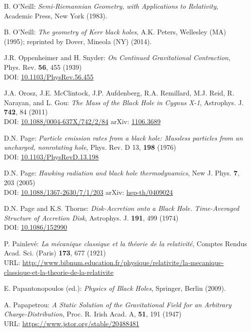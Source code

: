 \begin{thebibliography}{123}
B. O'Neill: {\em Semi-Riemannian Geometry, with Applications to Relativity},
Academic Press, New York (1983).

B. O'Neill: {\em The geometry of Kerr black holes}, A.K. Peters, Wellesley (MA) (1995);
reprinted by Dover, Mineola (NY) (2014).

J.R. Oppenheimer and H. Snyder:
{\em On Continued Gravitational Contraction},
Phys. Rev. {\bf 56}, 455 (1939)\\
DOI: \href{https://doi.org/10.1103/PhysRev.56.455}{10.1103/PhysRev.56.455}

J.A. Orosz, J.E. McClintock, J.P. Aufdenberg, R.A. Remillard, M.J. Reid, R. Narayan, and L. Gou:
{\em The Mass of the Black Hole in Cygnus X-1},
Astrophys. J. {\bf 742}, 84 (2011)\\
DOI: \href{https://doi.org/10.1088/0004-637X/742/2/84}{10.1088/0004-637X/742/2/84}\hfill
arXiv: \href{https://arxiv.org/abs/1106.3689}{1106.3689}

D.N. Page:
{\em Particle emission rates from a black hole: Massless particles from an uncharged, nonrotating hole},
Phys. Rev. D 13, {\bf 198} (1976)\\
DOI: \href{https://doi.org/10.1103/PhysRevD.13.198}{10.1103/PhysRevD.13.198}

D.N. Page:
{\em Hawking radiation and black hole thermodynamics},
New J. Phys. {\bf 7}, 203 (2005)\\
DOI: \href{https://doi.org/10.1088/1367-2630/7/1/203}{10.1088/1367-2630/7/1/203}\hfill
arXiv: \href{https://arxiv.org/abs/hep-th/0409024}{hep-th/0409024}

D.N. Page and K.S. Thorne:
{\em Disk-Accretion onto a Black Hole. Time-Averaged Structure of Accretion Disk},
Astrophys. J. {\bf 191}, 499 (1974)\\
DOI: \href{https://doi.org/10.1086/152990}{10.1086/152990}

P. Painlevé: \emph{La mécanique classique et la théorie de la relativité},
Comptes Rendus Acad. Sci. (Paris) {\bf 173}, 677 (1921)\\
URL: \url{http://www.bibnum.education.fr/physique/relativite/la-mecanique-classique-et-la-theorie-de-la-relativite}

E. Papantonopoulos (ed.): {\em Physics of Black Holes}, Springer, Berlin (2009).

A. Papapetrou:
{\em A Static Solution of the Gravitational Field for an Arbitrary Charge-Distribution},
Proc. R. Irish Acad. A, {\bf 51}, 191 (1947)\\
URL: \url{https://www.jstor.org/stable/20488481}


\end{thebibliography}
